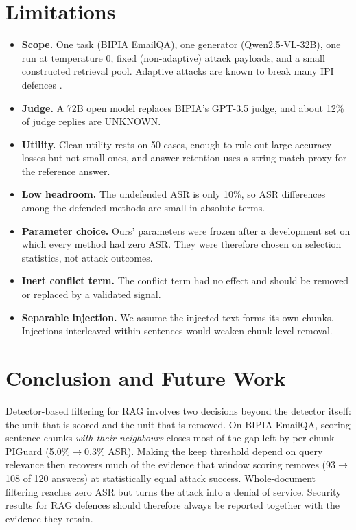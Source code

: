 \documentclass[conference]{IEEEtran}
\begin{document}
\section{Limitations}
\label{sec:limits}
\begin{itemize}
\item \textbf{Scope.} One task (BIPIA EmailQA), one generator
(Qwen2.5-VL-32B), one run at temperature 0, fixed (non-adaptive) attack
payloads, and a small constructed retrieval pool. Adaptive attacks are
known to break many IPI defences \cite{zhan2025}.
\item \textbf{Judge.} A 72B open model replaces BIPIA's GPT-3.5 judge, and
about 12\% of judge replies are UNKNOWN.
\item \textbf{Utility.} Clean utility rests on 50 cases, enough to
rule out large accuracy losses but not small ones, and answer retention
uses a string-match proxy for the reference answer.
\item \textbf{Low headroom.} The undefended ASR is only 10\%, so ASR
differences among the defended methods are small in absolute terms.
\item \textbf{Parameter choice.} Ours' parameters were frozen after a
development set on which every method had zero ASR. They were therefore
chosen on selection statistics, not attack outcomes.
\item \textbf{Inert conflict term.} The conflict term had no effect and
should be removed or replaced by a validated signal.
\item \textbf{Separable injection.} We assume the injected text forms its
own chunks. Injections interleaved within sentences would weaken
chunk-level removal.
\end{itemize}

\section{Conclusion and Future Work}
Detector-based filtering for RAG involves two decisions beyond the detector
itself: the unit that is scored and the unit that is removed. On BIPIA
EmailQA, scoring sentence chunks \emph{with their neighbours} closes most of
the gap left by per-chunk PIGuard (5.0\%$\rightarrow$0.3\% ASR). Making the
keep threshold depend on query relevance then recovers much of the evidence
that window scoring removes (93$\rightarrow$108 of 120 answers) at
statistically equal attack success. Whole-document filtering reaches zero
ASR but turns the attack into a denial of service. Security results for RAG
defences should therefore always be reported together with the evidence
they retain.
\end{document}
